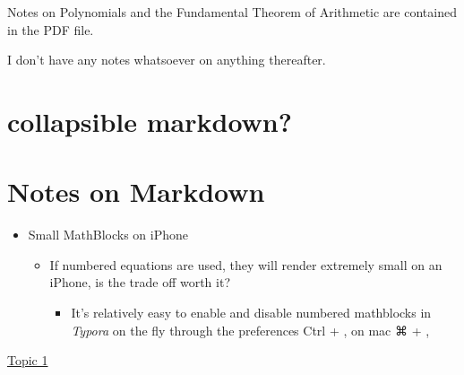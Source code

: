 \documentclass[
]{article}
\begin{document}
Notes on Polynomials and the Fundamental Theorem of Arithmetic are
contained in the PDF file.

I don't have any notes whatsoever on anything thereafter.

\hypertarget{header-n994}{%
\section{collapsible markdown?}\label{header-n994}}

\hypertarget{header-n996}{%
\section{Notes on Markdown}\label{header-n996}}

\begin{itemize}
\item
  Small MathBlocks on iPhone

  \begin{itemize}
  \item
    If numbered equations are used, they will render extremely small on
    an iPhone, is the trade off worth it?

    \begin{itemize}
    \item
      It's relatively easy to enable and disable numbered mathblocks in
      \emph{Typora} on the fly through the preferences Ctrl + , on mac ⌘
      + , 
    \end{itemize}
  \end{itemize}
\end{itemize}

\href{}{Topic 1}
\end{document}
